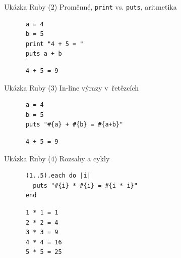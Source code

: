 \documentclass{beamer}
\begin{document}
\begin{frame}[fragile]{Ukázka Ruby (2)}
  Proměnné, \texttt{print} vs. \texttt{puts}, aritmetika
  \begin{block}{}
    \smallskip \footnotesize
    {\scriptsize \begin{verbatim}
      a = 4
      b = 5
      print "4 + 5 = "
      puts a + b
    \end{verbatim}}
  \end{block}
  \pause
  \begin{block}{}
    \smallskip \footnotesize
    {\scriptsize \begin{verbatim}
      4 + 5 = 9
    \end{verbatim}}
  \end{block}
\end{frame}

\begin{frame}[fragile]{Ukázka Ruby (3)}
  In-line výrazy v~řetězcích
  \begin{block}{}
    \smallskip \footnotesize
    {\scriptsize \begin{verbatim}
      a = 4
      b = 5
      puts "#{a} + #{b} = #{a+b}"
    \end{verbatim}}
  \end{block}
  \pause
  \begin{block}{}
    \smallskip \footnotesize
    {\scriptsize \begin{verbatim}
      4 + 5 = 9
    \end{verbatim}}
  \end{block}
\end{frame}

\begin{frame}[fragile]{Ukázka Ruby (4)}
  Rozsahy a cykly
  \begin{block}{}
    \smallskip \footnotesize
    {\scriptsize \begin{verbatim}
      (1..5).each do |i|
        puts "#{i} * #{i} = #{i * i}"
      end
    \end{verbatim}}
  \end{block}
  \pause
  \begin{block}{}
    \smallskip \footnotesize
    {\scriptsize \begin{verbatim}
      1 * 1 = 1
      2 * 2 = 4
      3 * 3 = 9
      4 * 4 = 16
      5 * 5 = 25
    \end{verbatim}}
  \end{block}
\end{frame}
\end{document}
